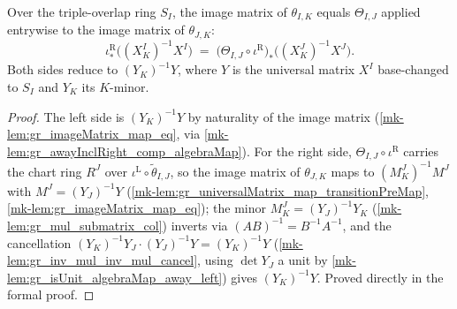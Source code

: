 \begin{lemma}\label{mk-lem:gr_cocycle_imageMatrix_eq}
  \leanok

  Over the triple-overlap ring \(S_I\), the image matrix of \(\theta_{I,K}\)
  equals \(\Theta_{I,J}\) applied entrywise to the image matrix of
  \(\theta_{J,K}\):
  \[
    \iota^{\mathrm{R}}_\ast\bigl((X^I_K)^{-1} X^I\bigr)
      \;=\;
      \bigl(\Theta_{I,J}\circ\iota^{\mathrm{R}}\bigr)_\ast
        \bigl((X^J_K)^{-1} X^J\bigr) .
  \]
  Both sides reduce to \((Y_K)^{-1} Y\), where \(Y\) is the universal matrix
  \(X^I\) base-changed to \(S_I\) and \(Y_K\) its \(K\)-minor.
\end{lemma}
\begin{proof}
  \leanok

The left side is \((Y_K)^{-1} Y\) by naturality of the image matrix
  (\ref{mk-lem:gr_imageMatrix_map_eq}, via \ref{mk-lem:gr_awayInclRight_comp_algebraMap}).
  For the right side, \(\Theta_{I,J}\circ\iota^{\mathrm{R}}\) carries the chart
  ring \(R^J\) over \(\iota^{\mathrm{L}}\circ\tilde\theta_{I,J}\), so the image
  matrix of \(\theta_{J,K}\) maps to \((M^J_K)^{-1} M^J\) with
  \(M^J = (Y_J)^{-1} Y\) (\ref{mk-lem:gr_universalMatrix_map_transitionPreMap},
  \ref{mk-lem:gr_imageMatrix_map_eq}); the minor \(M^J_K = (Y_J)^{-1} Y_K\)
  (\ref{mk-lem:gr_mul_submatrix_col}) inverts via \((AB)^{-1} = B^{-1}A^{-1}\), and
  the cancellation \((Y_K)^{-1} Y_J \cdot (Y_J)^{-1} Y = (Y_K)^{-1} Y\)
  (\ref{mk-lem:gr_inv_mul_inv_mul_cancel}, using \(\det Y_J\) a unit by
  \ref{mk-lem:gr_isUnit_algebraMap_away_left}) gives \((Y_K)^{-1} Y\). Proved
  directly in the formal proof.
\end{proof}

